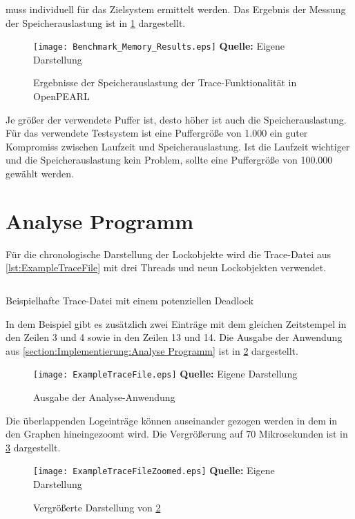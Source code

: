muss individuell für das Zielsystem ermittelt werden. Das Ergebnis der Messung
der Speicherauslastung ist in \cref{fig:BenchmarkMemoryResults} dargestellt.
\begin{figure}[ht]
  \texttt{[image: Benchmark\_Memory\_Results.eps]}
  \footnotesize\sffamily\textbf{Quelle:} Eigene Darstellung
  \caption{Ergebnisse der Speicherauslastung der Trace-Funktionalität in OpenPEARL}
  \label{fig:BenchmarkMemoryResults}
\end{figure}
Je größer der verwendete Puffer ist, desto höher ist auch die
Speicherauslastung. Für das verwendete Testsystem ist eine Puffergröße von 1.000
ein guter Kompromiss zwischen Laufzeit und Speicherauslastung. Ist die Laufzeit
wichtiger und die Speicherauslastung kein Problem, sollte eine Puffergröße von
100.000 gewählt werden.

\section{Analyse Programm}
\label{section:ValidierungAnalyseProgramm}
Für die chronologische Darstellung der Lockobjekte wird die Trace-Datei aus
\cref{lst:ExampleTraceFile} mit drei Threads und neun Lockobjekten verwendet.
\begin{listing}[ht]
  \begin{minipage}[ht]{\linewidth}
    \begin{multicols}{3}
      \inputminted[linenos]{text}{./Examples/ExampleTraceFile.log}
    \end{multicols}
    \caption{Beispielhafte Trace-Datei mit einem potenziellen Deadlock}
    \label{lst:ExampleTraceFile}
  \end{minipage}
\end{listing}
In dem Beispiel gibt es zusätzlich zwei Einträge mit dem gleichen Zeitstempel in
den Zeilen 3 und 4 sowie in den Zeilen 13 und 14. Die Ausgabe der Anwendung aus
\cref{section:Implementierung:Analyse Programm} ist in
\cref{fig:LockTraceVisualization} dargestellt.
\begin{figure}[ht]
  \texttt{[image: ExampleTraceFile.eps]}
  \footnotesize\sffamily\textbf{Quelle:} Eigene Darstellung
  \caption{Ausgabe der Analyse-Anwendung}
  \label{fig:LockTraceVisualization}
\end{figure}

Die überlappenden Logeinträge können auseinander gezogen werden in dem in den
Graphen hineingezoomt wird. Die Vergrößerung auf 70 Mikrosekunden ist in
\cref{fig:LockTraceVisualizationZoomed} dargestellt.
\begin{figure}[ht]
  \texttt{[image: ExampleTraceFileZoomed.eps]}
  \footnotesize\sffamily\textbf{Quelle:} Eigene Darstellung
  \caption{Vergrößerte Darstellung von \cref{fig:LockTraceVisualization}}
  \label{fig:LockTraceVisualizationZoomed}
\end{figure}

